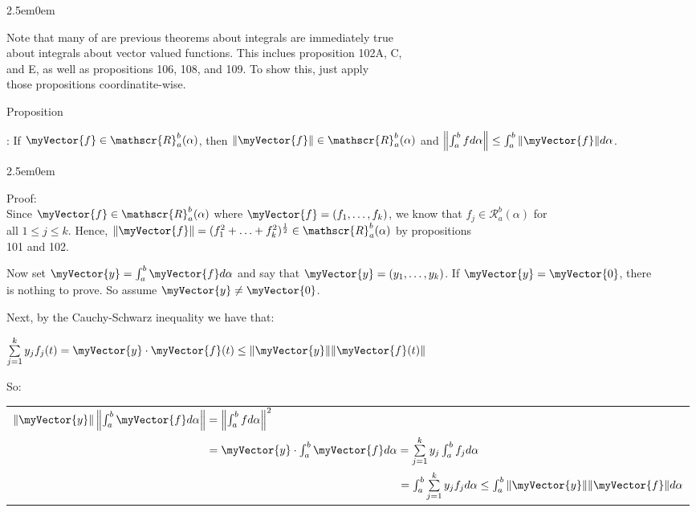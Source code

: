 \documentclass{book}
\newcommand{\hTwo}{%
   \color{MidnightBlue}%
   \fontsize{13}{15}\selectfont%
}
\newcommand{\hThree}{%
   \color{PineGreen!85!Orange}
   \fontsize{13}{15}\selectfont%
}
\newenvironment{myIndent}{%
   \begin{adjustwidth}{2.5em}{0em}%
}{%
   \end{adjustwidth}%
}
\newcounter{PropNumber}
\newcommand{\propCount}[1][1]{%
   \addtocounter{PropNumber}{#1}%
   \thePropNumber%
}
\newcommand{\retTwo}{\hfill\bigbreak}
\newcommand{\mVec}[1]{\myVector{#1}}
\begin{document}
\begin{myIndent}\hTwo
   Note that many of are previous theorems about integrals are immediately true\\ about integrals about vector valued functions. This inclues proposition 102A, C,\\ and E, as well as propositions 106, 108, and 109. To show this, just apply\\ those propositions coordinatite-wise.\retTwo\retTwo

   Proposition \propCount: If $\mVec{f} \in \mathscr{R}_a^b(\alpha)$, then $\|\mVec{f}\| \in \mathscr{R}_a^b(\alpha)$ and $\left\|\int_a^b fd\alpha\right\| \leq \int_a^b \|\mVec{f}\|d\alpha$.\retTwo
   
   {\begin{myIndent}\hThree
      Proof:\\
      Since $\mVec{f} \in \mathscr{R}_a^b(\alpha)$ where $\mVec{f} = (f_1, \ldots, f_k)$, we know that $f_j \in \mathscr{R}_a^b(\alpha)$ for\\ [-2pt] all $1 \leq j \leq k$. Hence, $\|\mVec{f}\| = (f_1^2 + \ldots + f_k^2)^\frac{1}{2} \in \mathscr{R}_a^b(\alpha)$ by propositions\\ [1pt] 101 and 102.\retTwo

      Now set $\mVec{y} = \int_a^b \mVec{f}d\alpha$ and say that $\mVec{y} = (y_1, \ldots, y_k)$. If $\mVec{y} = \mVec{0}$, there\\ [-2pt] is nothing to prove. So assume $\mVec{y} \neq \mVec{0}$.\retTwo

      Next, by the Cauchy-Schwarz inequality we have that:
      
      {\centering $\sum\limits_{j=1}^k y_jf_j(t) = \mVec{y} \cdot \mVec{f}(t) \leq \|\mVec{y}\|\|\mVec{f}(t)\|$ \retTwo\par}

      So:

      {\centering 
      \begin{tabular}{l}
         $\|\mVec{y}\|\left\|\int_a^b \mVec{f}d\alpha\right\| = \left\|\int_a^b fd\alpha \right\|^2$ \\ [3pt]

         $\hphantom{\|\mVec{y}\|\left\|\int_a^b \mVec{f}d\alpha\right\|} = \mVec{y} \cdot \int_a^b \mVec{f}d\alpha = \sum\limits_{j=1}^k y_j\int_a^b f_jd\alpha$ \\ [3pt]

         $\hphantom{\|\mVec{y}\|\left\|\int_a^b \mVec{f}d\alpha\right\| = \mVec{y} \cdot \int_a^b \mVec{f}d\alpha} = \int_a^b\sum\limits_{j=1}^k y_jf_jd\alpha \leq \int_a^b \|\mVec{y}\|\|\mVec{f}\|d\alpha$ \\ [3pt]


\end{tabular}}
\end{myIndent}}
\end{myIndent}
\end{document}
